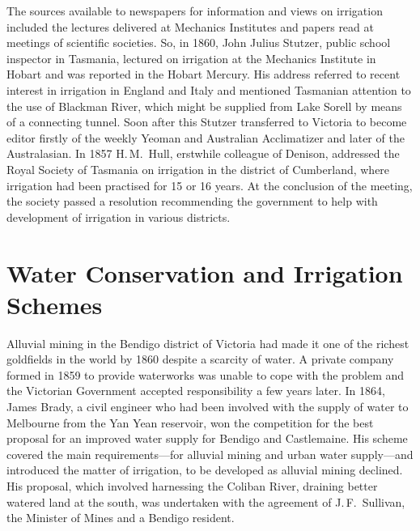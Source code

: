 The sources available to newspapers for information and views on
irrigation included the lectures delivered at Mechanics Institutes and
papers read at meetings of scientific societies.  So, in 1860, John
Julius Stutzer, public school inspector in Tasmania, lectured on
irrigation at the Mechanics Institute in Hobart and was reported in
the Hobart Mercury. His address referred to recent interest in
irrigation in England and Italy and mentioned Tasmanian attention to
the use of Blackman River, which might be supplied from Lake Sorell by
means of a connecting tunnel.  Soon after this Stutzer transferred to
Victoria to become editor firstly of the weekly Yeoman and Australian
Acclimatizer and later of the Australasian.  In 1857 H.\,M.~Hull,
erstwhile colleague of Denison, addressed the Royal Society of
Tasmania on irrigation in the district of Cumberland, where irrigation
had been practised for 15 or 16 years.  At the conclusion of the
meeting, the society passed a resolution recommending the government
to help with development of irrigation in various
districts.

\section*{Water Conservation and Irrigation Schemes}

Alluvial mining in the Bendigo district of Victoria had made it one of
the richest goldfields in the world by 1860 despite a scarcity of
water.  A private company formed in 1859 to provide waterworks was
unable to cope with the problem and the Victorian Government accepted
responsibility a few years later.  In 1864, James Brady, a civil
engineer who had been involved with the supply of water to Melbourne
from the Yan Yean reservoir, won the competition for the best proposal
for an improved water supply for Bendigo and Castlemaine. His scheme
covered the main requirements---for alluvial mining and urban water
supply---and introduced the matter of irrigation, to be developed as
alluvial mining declined.  His proposal, which involved harnessing the
Coliban River, draining better watered land at the south, was
undertaken with the agreement of J.\,F.~Sullivan, the Minister of
Mines and a Bendigo resident.

